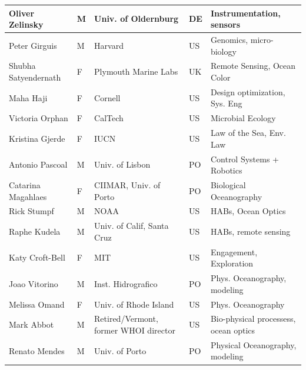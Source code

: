\begin{table}[H]
{\begin{tabular}{|p{3cm}|p{0.5cm}|p{3.5cm}|p{0.5cm}|p{6cm}|}
\hline
Oliver Zelinsky          & M   & Univ. of Oldernburg                   & DE       & Instrumentation, sensors                        \\
\hline
Peter Girguis            & M   & Harvard                               & US       & Genomics, micro-biology                         \\
\hline
Shubha Satyendernath     & F   & Plymouth Marine Labs                  & UK       & Remote Sensing, Ocean Color                     \\
\hline
Maha Haji                & F   & Cornell                               & US       & Design optimization, Sys. Eng                   \\
\hline
Victoria Orphan          & F   & CalTech                               & US       & Microbial Ecology                               \\
\hline
Kristina Gjerde          & F   & IUCN                                  & US       & Law of the Sea, Env. Law                        \\
\hline
Antonio Pascoal          & M   & Univ. of Lisbon                       & PO       & Control Systems + Robotics                      \\
\hline
Catarina Magahlaes       & F   & CIIMAR, Univ. of Porto                & PO       & Biological Oceanography                         \\
\hline
Rick Stumpf              & M   & NOAA                                  & US       & HABs, Ocean Optics                              \\
\hline
Raphe Kudela             & M   & Univ. of Calif, Santa Cruz            & US       & HABs, remote sensing                            \\
\hline
Katy Croft-Bell          & F   & MIT                                   & US       & Engagement, Exploration                         \\
\hline
Joao Vitorino            & M   & Inst. Hidrografico                    & PO       & Phys. Oceanography, modeling                    \\
\hline
Melissa Omand            & F   & Univ. of Rhode Island                 & US       & Phys. Oceanography                              \\
\hline
Mark Abbot               & M   & Retired/Vermont, former WHOI director & US       & Bio-physical processess, ocean optics           \\
\hline
Renato Mendes            & M   & Univ. of Porto                        & PO       & Physical Oceanography, modeling                 \\

\end{tabular}}
\end{table}
